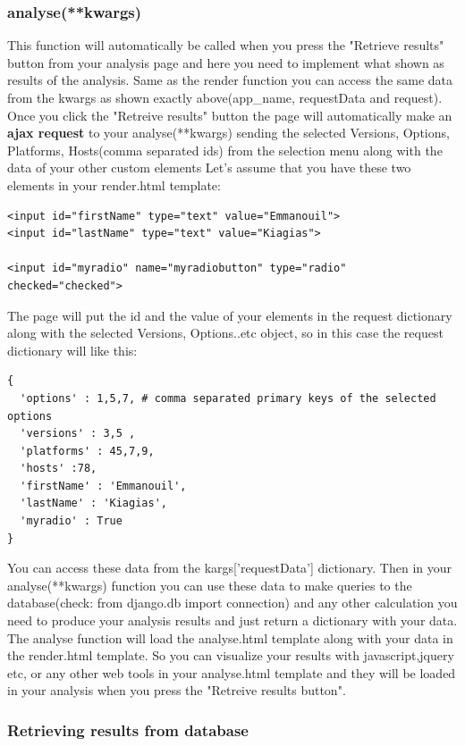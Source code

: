 \documentclass{lhcbnote}
\begin{document}
\subsubsection{analyse(**kwargs)}

This function will automatically  be called when you press the "Retrieve results" button from your analysis page 
and here you need to implement what shown as results of the analysis.  
Same as the render function you can access the same data from the kwargs as shown exactly above(app\_name, requestData and request). 
Once you click the "Retreive results" button the page will automatically make an {\bf ajax request} to your analyse(**kwargs) sending the 
selected Versions, Options, Platforms, Hosts(comma separated ids) from the selection menu along with the data of your other custom elements
Let's assume that you have these two elements in your render.html template:

\begin{verbatim}
<input id="firstName" type="text" value="Emmanouil">
<input id="lastName" type="text" value="Kiagias">

<input id="myradio" name="myradiobutton" type="radio" checked="checked">
\end{verbatim}

The page will put the id and the value of your elements in the request dictionary along with the selected Versions, Options..etc object, so in this case the request dictionary will like this:

\begin{verbatim}
{
  'options' : 1,5,7, # comma separated primary keys of the selected options 
  'versions' : 3,5 , 
  'platforms' : 45,7,9,
  'hosts' :78,
  'firstName' : 'Emmanouil',
  'lastName' : 'Kiagias',
  'myradio' : True
} 
\end{verbatim} 

You can access these data from the kargs['requestData'] dictionary. Then in your analyse(**kwargs) function you can use these data to make queries to the database(check: from django.db import connection)
and any other calculation you need to produce your analysis results and just return a dictionary with your data. The analyse function will load the analyse.html template along with your data in the render.html template.
So you can visualize your results with javascript,jquery etc, or any other web tools in your analyse.html template and they will be loaded in your analysis when you press the "Retreive results button".

\subsubsection{Retrieving results from database}
\end{document}
